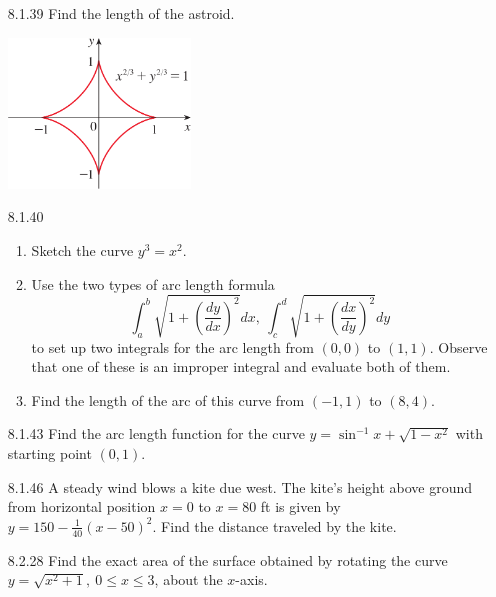 \documentclass{article}
\begin{document}
\begin{enumerate}
\item[8.1.39]
    Find the length of the astroid.
    \begin{center}
        \includegraphics[height=4cm]{./png/8.1.39.png}
    \end{center}

\vspace{6cm}

\item[8.1.40]
    \begin{enumerate}
        \item Sketch the curve $y^{3} = x^{2}$.
        \item Use the two types of arc length formula
            \[
                \int_{a}^{b} \sqrt{1 + \left(\frac{dy}{dx}\right)^{2}} dx,\
                \int_{c}^{d} \sqrt{1 + \left(\frac{dx}{dy}\right)^{2}} dy
            \]
            to set up two integrals for the arc length from $(0, 0)$
            to $(1, 1)$. Observe that one of these is an improper integral and
            evaluate both of them.
        \item Find the length of the arc of this curve from $(-1, 1)$
            to $(8, 4)$.
    \end{enumerate}

\newpage

\item[8.1.43]
    Find the arc length function for the curve
    $y = \sin^{-1}x + \sqrt{1-x^{2}}$ with starting point $(0, 1)$.


\vspace{6cm}

\item[8.1.46]
    A steady wind blows a kite due west. The kite's height above ground from
    horizontal position $x=0$ to $x=80$ ft is given by $y=150 - \frac{1}{40}(x-50)^{2}$.
    Find the distance traveled by the kite.

\vspace{6cm}

\item[8.2.28]
    Find the exact area of the surface obtained by rotating the curve
    $y=\sqrt{x^{2}+1},\ 0 \leqslant x \leqslant 3$, about the $x$-axis.


\end{enumerate}
\end{document}
